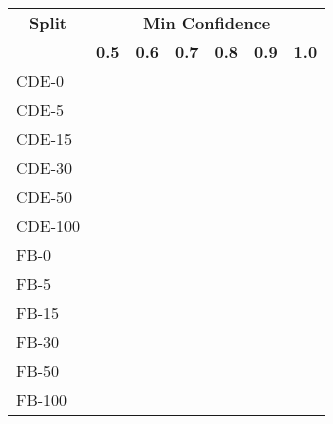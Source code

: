 \begin{tabular}{| l | r | r | r | r | r | r |}
    \hline

    \multicolumn{1}{|c|}{\textbf{Split}} &
    \multicolumn{7}{|c|}{\textbf{Min Confidence}} \\

    \multicolumn{1}{|c|}{} &
    \multicolumn{1}{|c|}{\textbf{0.5}} &
    \multicolumn{1}{|c|}{\textbf{0.6}} &
    \multicolumn{1}{|c|}{\textbf{0.7}} &
    \multicolumn{1}{|c|}{\textbf{0.8}} &
    \multicolumn{1}{|c|}{\textbf{0.9}} &
    \multicolumn{1}{|c|}{\textbf{1.0}} \\

    \hline \hline

    CDE-0   &  &  &  &  &  &  \\
    CDE-5   &  &  &  &  &  &  \\
    CDE-15  &  &  &  &  &  &  \\
    CDE-30  &  &  &  &  &  &  \\
    CDE-50  &  &  &  &  &  &  \\
    CDE-100 &  &  &  &  &  &  \\

    \hline

    FB-0    &  &  &  &  &  &  \\
    FB-5    &  &  &  &  &  &  \\
    FB-15   &  &  &  &  &  &  \\
    FB-30   &  &  &  &  &  &  \\
    FB-50   &  &  &  &  &  &  \\
    FB-100  &  &  &  &  &  &  \\

    \hline
\end{tabular}
